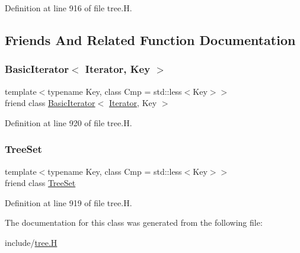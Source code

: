 Definition at line 916 of file tree.\+H.



\subsection{Friends And Related Function Documentation}
\mbox{\label{class_designar_1_1_tree_set_1_1_iterator_a0b375a570add16b09037ce1773f0ddbb}} 
\subsubsection{\texorpdfstring{Basic\+Iterator$<$ Iterator, Key $>$}{BasicIterator< Iterator, Key >}}
{\footnotesize\ttfamily template$<$typename Key, class Cmp = std\+::less$<$\+Key$>$$>$ \\
friend class \hyperlink{class_designar_1_1_basic_iterator}{Basic\+Iterator}$<$ \hyperlink{class_designar_1_1_tree_set_1_1_iterator}{Iterator}, Key $>$\hspace{0.3cm}{\ttfamily [friend]}}



Definition at line 920 of file tree.\+H.

\mbox{\label{class_designar_1_1_tree_set_1_1_iterator_a7caa42294700d2a60905ec3458a7cd8a}} 
\subsubsection{\texorpdfstring{Tree\+Set}{TreeSet}}
{\footnotesize\ttfamily template$<$typename Key, class Cmp = std\+::less$<$\+Key$>$$>$ \\
friend class \hyperlink{class_designar_1_1_tree_set}{Tree\+Set}\hspace{0.3cm}{\ttfamily [friend]}}



Definition at line 919 of file tree.\+H.



The documentation for this class was generated from the following file\+:\begin{DoxyCompactItemize}
\item 
include/\hyperlink{tree_8_h}{tree.\+H}\end{DoxyCompactItemize}
